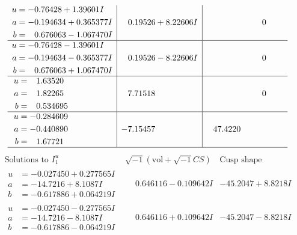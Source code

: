 \documentclass[1p]{elsarticle_modified}
\theoremstyle{definition}
\newcommand{\I}{\sqrt{-1}}
\begin{document}
$$\begin{array}{c|c|c}
\begin{aligned}
u &= -0.76428 + 1.39601 I \\
a &= -0.194634 + 0.365377 I \\
b &= \phantom{-}0.676063 - 1.067470 I\end{aligned}
 & \phantom{-}0.19526 + 8.22606 I & \phantom{-0.000000 } 0 \\ \hline\begin{aligned}
u &= -0.76428 - 1.39601 I \\
a &= -0.194634 - 0.365377 I \\
b &= \phantom{-}0.676063 + 1.067470 I\end{aligned}
 & \phantom{-}0.19526 - 8.22606 I & \phantom{-0.000000 } 0 \\ \hline\begin{aligned}
u &= \phantom{-}1.63520\phantom{ +0.000000I} \\
a &= \phantom{-}1.82265\phantom{ +0.000000I} \\
b &= \phantom{-}0.534695\phantom{ +0.000000I}\end{aligned}
 & \phantom{-}7.71518\phantom{ +0.000000I} & \phantom{-0.000000 } 0 \\ \hline\begin{aligned}
u &= -0.284609\phantom{ +0.000000I} \\
a &= -0.440890\phantom{ +0.000000I} \\
b &= \phantom{-}1.67721\phantom{ +0.000000I}\end{aligned}
 & -7.15457\phantom{ +0.000000I} & \phantom{-}47.4220\phantom{ +0.000000I}\\
 \hline 
 \end{array}$$\newpage$$\begin{array}{c|c|c}  
\text{Solutions to }I^u_{1}& \I (\text{vol} + \sqrt{-1}CS) & \text{Cusp shape}\\
 \hline 
\begin{aligned}
u &= -0.027450 + 0.277565 I \\
a &= -14.7216 + 8.1087 I \\
b &= -0.617886 + 0.064219 I\end{aligned}
 & \phantom{-}0.646116 - 0.109642 I & -45.2047 + 8.8218 I \\ \hline\begin{aligned}
u &= -0.027450 - 0.277565 I \\
a &= -14.7216 - 8.1087 I \\
b &= -0.617886 - 0.064219 I\end{aligned}
 & \phantom{-}0.646116 + 0.109642 I & -45.2047 - 8.8218 I \\ \hline\begin{aligned}

\end{aligned}
\end{array}$$
\end{document}
